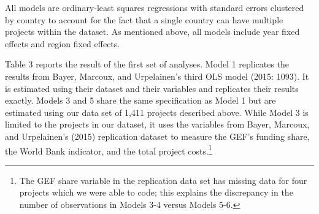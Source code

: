 \documentclass{article}
\begin{document}
All models are ordinary-least squares regressions with standard errors clustered by country to account for the fact that a single country can have multiple projects within the dataset.  As mentioned above, all models include year fixed effects and region fixed effects.

Table 3 reports the result of the first set of analyses.  Model 1 replicates the results from Bayer, Marcoux, and Urpelainen’s third OLS model (2015: 1093).  It is estimated using their dataset and their variables and replicates their results exactly.  Models 3 and 5 share the same specification as Model 1 but are estimated using our data set of 1,411 projects described above.  While Model 3 is limited to the projects in our dataset, it uses the variables from Bayer, Marcoux, and Urpelainen’s (2015) replication dataset to measure the GEF’s funding share, the World Bank indicator, and the total project costs.\footnote{The GEF share variable in the replication data set has missing data for four projects which we were able to code; this explains the discrepancy in the number of observations in Models 3-4 versus Models 5-6.}
\end{document}
